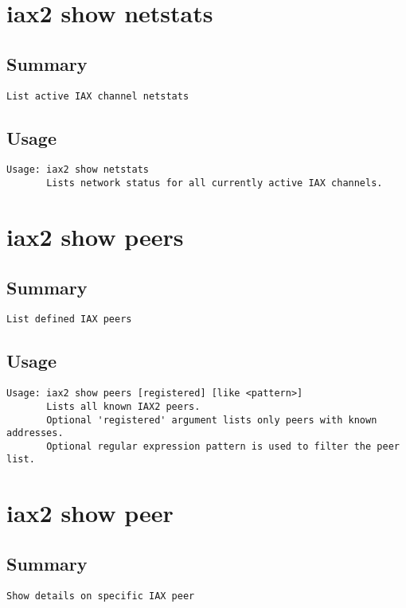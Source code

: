 \section{iax2 show netstats}
\subsection{Summary}
\begin{verbatim}
List active IAX channel netstats
\end{verbatim}
\subsection{Usage}
\begin{verbatim}
Usage: iax2 show netstats
       Lists network status for all currently active IAX channels.

\end{verbatim}


\section{iax2 show peers}
\subsection{Summary}
\begin{verbatim}
List defined IAX peers
\end{verbatim}
\subsection{Usage}
\begin{verbatim}
Usage: iax2 show peers [registered] [like <pattern>]
       Lists all known IAX2 peers.
       Optional 'registered' argument lists only peers with known addresses.
       Optional regular expression pattern is used to filter the peer list.

\end{verbatim}


\section{iax2 show peer}
\subsection{Summary}
\begin{verbatim}
Show details on specific IAX peer
\end{verbatim}

